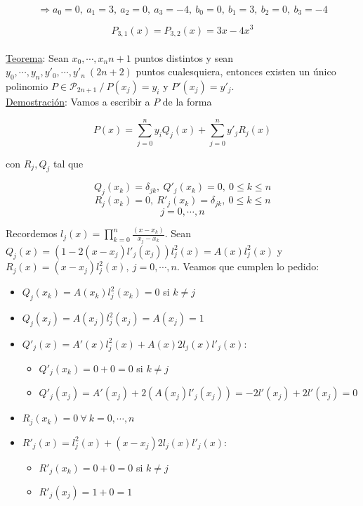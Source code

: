 $$\Rightarrow a_{0} = 0,\ a_{1} = 3,\ a_{2} = 0,\ a_{3} = -4,\ b_{0} = 0,\ b_{1} = 3,\ b_{2} = 0,\ b_{3} = -4$$

$$P_{3, 1}(x) = P_{3, 2}(x) = 3x - 4x^{3}$$\\

\underline{Teorema}: Sean $x_{0}, \cdots, x_{n} n + 1$ puntos distintos y sean $y_{0}, \cdots, y_{n}, y'_{0}, \cdots, y'_{n}\ (2n + 2)$ puntos cualesquiera, entonces existen un \'unico polinomio $P \in \mathcal{P}_{2n + 1}\ /\ P(x_{j}) = y_{i}$ y $P'(x_{j}) = y'_{j}$.\\

\underline{Demostraci\'on}: Vamos a escribir a $P$ de la forma

$$P(x) = \sum \limits_{j = 0}^{n} y_{i}Q_{j}(x) + \sum \limits_{j = 0}^{n} y'_{j}R_{j}(x)$$

con $R_{j}, Q_{j}$ tal que

$$Q_{j}(x_{k}) = \delta_{jk},\ Q'_{j}(x_{k}) = 0,\ 0 \leq k \leq n$$
$$R_{j}(x_{k}) = 0,\ R'_{j}(x_{k}) = \delta_{jk},\ 0 \leq k \leq n$$
$$j = 0, \cdots, n$$

Recordemos $l_{j}(x) = \prod \limits_{k = 0}^{n} \frac{(x - x_{k})}{x_{j} - x_{k}}$. Sean $Q_{j}(x) = (1 - 2(x - x_{j})l'_{j}(x_{j}))l_{j}^{2}(x) = A(x)l_{j}^{2}(x)$ y $R_{j}(x) = (x - x_{j})l_{j}^{2}(x),\ j = 0, \cdots, n$. Veamos que cumplen lo pedido:\\

\begin{itemize}
	\item $Q_{j}(x_{k}) = A(x_{k})l_{j}^{2}(x_{k}) = 0$ si $k \neq j$
	\item $Q_{j}(x_{j}) = A(x_{j})l_{j}^{2}(x_{j}) = A(x_{j}) = 1$
	\item $Q'_{j}(x) = A'(x)l_{j}^{2}(x) + A(x)2l_{j}(x)l'_{j}(x)$:
	
	\begin{itemize}
		\item $Q'_{j}(x_{k}) = 0 + 0 = 0$ si $k \neq j$
		\item $Q'_{j}(x_{j}) = A'(x_{j}) + 2(A(x_{j})l'_{j}(x_{j})) = -2l'(x_{j}) + 2l'(x_{j}) = 0$
	\end{itemize}
	
	\item $R_{j}(x_{k}) = 0\ \forall \ k = 0, \cdots, n$
	\item $R'_{j}(x) = l_{j}^{2}(x) + (x - x_{j})2l_{j}(x)l'_{j}(x)$:
	
	\begin{itemize}
		\item $R'_{j}(x_{k}) = 0 + 0 = 0$ si $k \neq j$
		\item $R'_{j}(x_{j}) = 1 + 0 = 1$
	\end{itemize}
\end{itemize}


